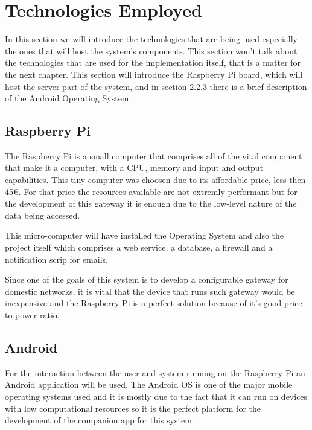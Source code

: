 
\section{Technologies Employed}
\label{chap2:sec:tech}
In this section we will introduce the technologies that are being used
especially the ones that will host the system's components. This section won't
talk about the technologies that are used for the implementation itself, that is
a matter for the next chapter. This section will introduce the Raspberry Pi
board, which will host the server part of the system, and in section 2.2.3 there
is a brief description of the Android Operating System.

\subsection{Raspberry Pi}
\label{chap2:sec:tech:rasp}
The Raspberry Pi is a small computer that comprises all of the vital component
that make it a computer, with a CPU, memory and input and output capabilities.
This tiny computer was choosen due to its affordable price, less then 45€. For
that price the resources available are not extremly performant but for the
development of this gateway it is enough due to the low-level nature of the data
being accessed.

This micro-computer will have installed the Operating System and also the
project itself which comprises a web service, a database, a firewall and a
notification scrip for emails.

Since one of the goals of this system is to develop a configurable gateway for
domestic networks, it is vital that the device that runs such gateway would be
inexpensive and the Raspberry Pi is a perfect solution because of it's good
price to power ratio.

\subsection{Android}
\label{chap2:sec:tech:android}
For the interaction between the user and system running on the Raspberry Pi an
Android application will be used. The Android OS is one of the major mobile
operating systems used and it is mostly due to the fact that it can run on
devices with low computational resources so it is the perfect platform for the
development of the companion app for this system.

